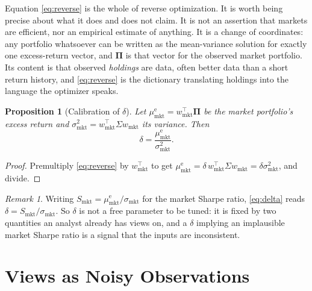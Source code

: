 \documentclass[11pt]{article}
\newtheorem{proposition}{Proposition}
\theoremstyle{remark}
\newtheorem*{remark}{Remark}
\theoremstyle{definition}
\begin{document}
Equation \eqref{eq:reverse} is the whole of reverse optimization. It is worth being precise about what it does and does not claim. It is not an assertion that markets are efficient, nor an empirical estimate of anything. It is a change of coordinates: any portfolio whatsoever can be written as the mean-variance solution for exactly one excess-return vector, and $\boldsymbol\Pi$ is that vector for the observed market portfolio. Its content is that observed \emph{holdings} are data, often better data than a short return history, and \eqref{eq:reverse} is the dictionary translating holdings into the language the optimizer speaks.

\begin{proposition}[Calibration of $\delta$]
\label{prop:delta}
Let $\mu^{\mathrm{e}}_{\mathrm{mkt}} = w_{\mathrm{mkt}}^\top\boldsymbol\Pi$ be the market portfolio's excess return and $\sigma^2_{\mathrm{mkt}} = w_{\mathrm{mkt}}^\top\Sigma w_{\mathrm{mkt}}$ its variance. Then
\begin{equation}
\label{eq:delta}
\delta = \frac{\mu^{\mathrm{e}}_{\mathrm{mkt}}}{\sigma^2_{\mathrm{mkt}}}.
\end{equation}
\end{proposition}

\begin{proof}
Premultiply \eqref{eq:reverse} by $w_{\mathrm{mkt}}^\top$ to get $\mu^{\mathrm{e}}_{\mathrm{mkt}} = \delta\, w_{\mathrm{mkt}}^\top\Sigma w_{\mathrm{mkt}} = \delta\sigma^2_{\mathrm{mkt}}$, and divide.
\end{proof}

\begin{remark}
\label{rem:delta-sharpe}
Writing $S_{\mathrm{mkt}} = \mu^{\mathrm{e}}_{\mathrm{mkt}}/\sigma_{\mathrm{mkt}}$ for the market Sharpe ratio, \eqref{eq:delta} reads $\delta = S_{\mathrm{mkt}}/\sigma_{\mathrm{mkt}}$. So $\delta$ is not a free parameter to be tuned: it is fixed by two quantities an analyst already has views on, and a $\delta$ implying an implausible market Sharpe ratio is a signal that the inputs are inconsistent.
\end{remark}

\section{Views as Noisy Observations}
\label{sec:bayes}
\end{document}
